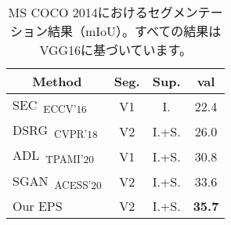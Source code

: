 \begin{table}[]
\centering
{\small
\begin{tabular}{@{}lccc@{}}
\toprule
\multicolumn{1}{c}{Method}                                                  &Seg.       &Sup.   & \multicolumn{1}{c}{val}           \\ \midrule
\multicolumn{1}{l}{SEC~\cite{kolesnikov2016seed}\textsubscript{ECCV'16}}    & V1        &I.     & \multicolumn{1}{c}{22.4}          \\
\multicolumn{1}{l}{DSRG~\cite{huang2018weakly}\textsubscript{CVPR'18}}      & V2        &I.+S.  & \multicolumn{1}{c}{26.0}          \\
\multicolumn{1}{l}{ADL~\cite{choe2020attention}\textsubscript{TPAMI'20}}    & V1        &I.+S.  & \multicolumn{1}{c}{30.8}          \\
\multicolumn{1}{l}{SGAN~\cite{yao2020saliency}\textsubscript{ACESS'20}}     & V2        &I.+S.  & \multicolumn{1}{c}{33.6}          \\ \midrule
\multicolumn{1}{l}{Our EPS}                                                 & V2        &I.+S.  & \multicolumn{1}{c}{\textbf{35.7}} \\ \bottomrule
\end{tabular}
}
\vspace{2mm}
\caption{MS COCO 2014におけるセグメンテーション結果（mIoU）。すべての結果はVGG16に基づいています。}\vspace{-2mm}
\label{tab:seg_quantitative_coco}
\end{table}
